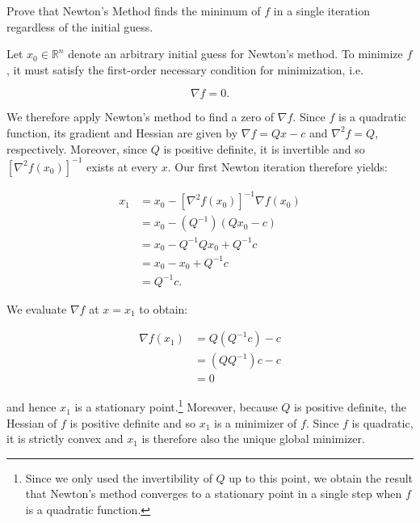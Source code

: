 Prove that Newton's Method finds the minimum of $f$ in a single iteration regardless of the initial guess.

\begin{solution}
  Let $x_0 \in \mathbb{R}^n$ denote an arbitrary initial guess for Newton's method. To minimize $f$, it must 
  satisfy the first-order necessary condition for minimization, i.e.

  $$
  \nabla f = 0.
  $$

  We therefore apply Newton's method to find a zero of $\nabla f$. Since $f$ is a quadratic function, its gradient and 
  Hessian are given by $\nabla f = Q x - c$ and $\nabla^2 f = Q$, respectively. Moreover, since $Q$ is positive
  definite, it is invertible and so $\left[\nabla^2 f(x_0) \right]^{-1}$ exists at every $x$. Our first Newton iteration
  therefore yields:

  \begin{align*}
    x_1 &= x_0 - \left[\nabla^2 f(x_0) \right]^{-1} \nabla f(x_0) \\
        &= x_0 - \left( Q^{-1} \right) \left(Q x_0 - c \right) \\
        &= x_0 - Q^{-1} Q x_0 + Q^{-1} c \\
        &= x_0 - x_0 + Q^{-1} c \\
        &= Q^{-1} c.
  \end{align*}

  We evaluate $\nabla f$ at $x = x_1$ to obtain:

  \begin{align*}
    \nabla f(x_1) &= Q \left( Q^{-1} c \right) - c \\
                  &= \left( Q  Q^{-1} \right) c - c \\
                  &= 0
  \end{align*}

  and hence $x_1$ is a stationary point.\footnote{
    Since we only used the invertibility of $Q$ up to this point, we obtain the result that Newton's method converges 
    to a stationary point in a single step when $f$ is a quadratic function.
  } Moreover, because $Q$ is positive definite, the Hessian of $f$ is positive 
  definite and so $x_1$ is a minimizer of $f$. Since $f$ is quadratic, it is strictly convex and $x_1$ is therefore
  also the unique global minimizer.
  \ \\
\end{solution}